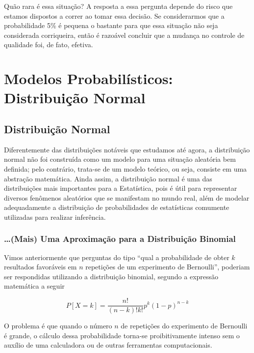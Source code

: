 \documentclass[
]{book}
\theoremstyle{definition}
\theoremstyle{definition}
\theoremstyle{definition}
\theoremstyle{remark}
\begin{document}
Quão rara é essa situação? A resposta a essa pergunta depende do risco que estamos dispostos a correr ao tomar essa decisão. Se considerarmos que a probabilidade 5\% é pequena o bastante para que essa situação não seja considerada corriqueira, então é razoável concluir que a mudança no controle de qualidade foi, de fato, efetiva.

\hypertarget{modelos-probabiluxedsticos-distribuiuxe7uxe3o-normal}{%
\chapter{Modelos Probabilísticos: Distribuição Normal}\label{modelos-probabiluxedsticos-distribuiuxe7uxe3o-normal}}

\hypertarget{distribuiuxe7uxe3o-normal}{%
\section{Distribuição Normal}\label{distribuiuxe7uxe3o-normal}}

Diferentemente das distribuições notáveis que estudamos até agora, a distribuição normal não foi construída como um modelo para uma situação aleatória bem definida; pelo contrário, trata-se de um modelo teórico, ou seja, consiste em uma abstração matemática. Ainda assim, a distribuição normal é uma das distribuições mais importantes para a Estatística, pois é útil para representar diversos fenômenos aleatórios que se manifestam no mundo real, além de modelar adequadamente a distribuição de probabilidades de estatísticas comumente utilizadas para realizar inferência.

\hypertarget{mais-uma-aproximauxe7uxe3o-para-a-distribuiuxe7uxe3o-binomial}{%
\subsection*{\ldots(Mais) Uma Aproximação para a Distribuição Binomial}\label{mais-uma-aproximauxe7uxe3o-para-a-distribuiuxe7uxe3o-binomial}}

Vimos anteriormente que perguntas do tipo ``qual a probabilidade de obter \(k\) resultados favoráveis em \(n\) repetições de um experimento de Bernoulli'', poderiam ser respondidas utilizando a distribuição binomial, segundo a expressão matemática a seguir

\[P[X = k] = \frac{n!}{(n-k)!k!} p^k (1-p)^{n-k}\]

O problema é que quando o número \(n\) de repetições do experimento de Bernoulli é grande, o cálculo dessa probabilidade torna-se proibitivamente intenso sem o auxílio de uma calculadora ou de outras ferramentas computacionais.
\end{document}
